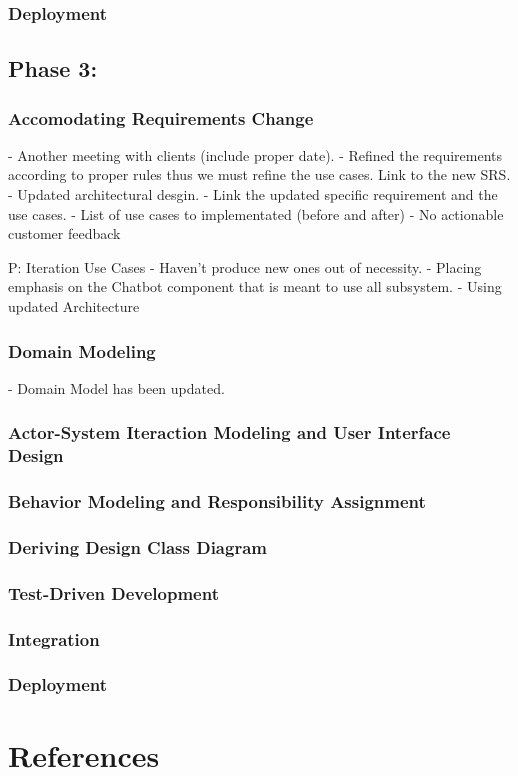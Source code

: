\documentclass[11pt]{article}
\begin{document}
\subsubsection{Deployment}

\subsection{Phase 3:}

\subsubsection{Accomodating Requirements Change}
- Another meeting with clients (include proper date).
- Refined the requirements according to proper rules thus we must refine the use cases. Link to the new SRS.
- Updated architectural desgin.
- Link the updated specific requirement and the use cases.
- List of use cases to implementated (before and after)
- No actionable customer feedback

P: Iteration Use Cases
- Haven't produce new ones out of necessity.
- Placing emphasis on the Chatbot component that is meant to use all subsystem.
- Using updated Architecture

\subsubsection{Domain Modeling}
- Domain Model has been updated.

\subsubsection{Actor-System Iteraction Modeling and User Interface Design}

\subsubsection{Behavior Modeling and Responsibility Assignment}

\subsubsection{Deriving Design Class Diagram}

\subsubsection{Test-Driven Development}

\subsubsection{Integration}

\subsubsection{Deployment}

\section{References}


\end{document}
